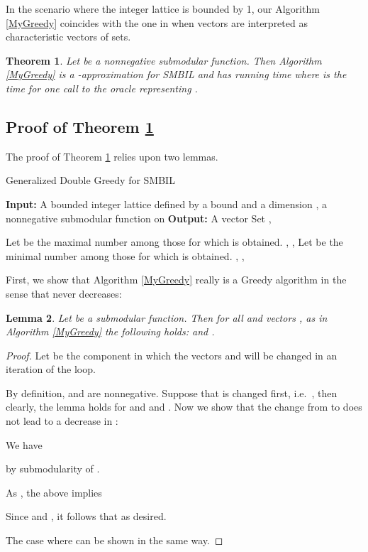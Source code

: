 \documentclass{article}
\theoremstyle{plain}
\newtheorem{theorem}{Theorem}
\newtheorem{lemma}[theorem]{Lemma}
\theoremstyle{definition}
\begin{document}
In the scenario where the integer lattice is bounded by 1, our Algorithm \ref{MyGreedy} coincides with the one in \cite{DoubleGreedy} 
when vectors are interpreted as characteristic vectors of sets. 

\begin{theorem}\label{ApproximationThm}
Let  be a nonnegative submodular function. 
Then Algorithm \ref{MyGreedy} is a -approximation for SMBIL and has running time 
 where  is the time for one call to the oracle representing . 
\end{theorem}

\subsection{Proof of Theorem \ref{ApproximationThm}}

The proof of Theorem \ref{ApproximationThm} relies upon two lemmas. 

\begin{algorithm2e}[htb]
\caption{Generalized Double Greedy for SMBIL}
\DontPrintSemicolon
\textbf{Input:} A bounded integer lattice defined by a bound  and a dimension , 
a nonnegative submodular function  on 
\;
\textbf{Output:} A vector \;
Set , \;
{

  \;
  \;
  \If {}
  {
    Let  be the maximal number among those for which  is obtained.\; 
    , \;  
    , \;
  } 
  \Else
  {
    Let  be the minimal number among those for which  is obtained.\; 
    , \;  
    , \;
  }
\;  
}
\Return{ }\;
\label{MyGreedy}
\end{algorithm2e}

First, we show that Algorithm \ref{MyGreedy} really is a Greedy algorithm 
in the sense that  never decreases:
\begin{lemma}\label{IncreaseLemma}
Let  be a submodular function. Then for all 
and vectors ,  as in Algorithm \ref{MyGreedy} the following holds: 
 and . 
\end{lemma}


\begin{proof}
Let  be the component in which the vectors  and  will be changed in an iteration of the loop. 


By definition,  and  are nonnegative.
Suppose that  is changed first, i.e.\ , then  clearly, 
the lemma holds for  and  and .
Now we show that the change from  to  does not lead to a decrease in :

We have
 
 by submodularity of . 
 
 As , the above implies
 
Since  and , it follows that  as desired.  
  
  


The case where  can be shown in the same way.
\end{proof}
\end{document}
